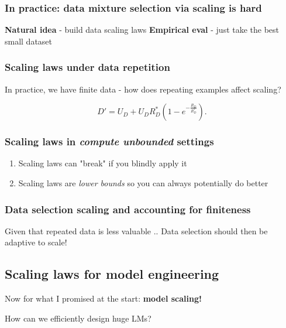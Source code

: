 \documentclass[12pt,twoside]{article}
\begin{document}
\subsubsection*{In practice: data mixture selection via scaling is hard}

\textbf{Natural idea} - build data scaling laws \hfill \textbf{Empirical eval} - just take the best small dataset

\subsubsection*{Scaling laws under data repetition}

In practice, we have finite data - how does repeating examples affect scaling?

\begin{equation*}
    D' = U_D + U_DR^{*}_D(1 - e^{-\frac{R_D}{R^{*}_D}}).
\end{equation*}

\subsubsection*{Scaling laws in \textit{compute unbounded} settings}

\begin{enumerate}
    \item Scaling laws can "break" if you blindly apply it
    \item Scaling laws are \textit{lower bounds} so you can always potentially do better
\end{enumerate}

\subsubsection*{Data selection scaling and accounting for finiteness}

Given that repeated data is less valuable .. Data selection should then be adaptive to scale!

\subsection*{Scaling laws for model engineering}

Now for what I promised at the start: \textbf{model scaling!}

\begin{question}
    How can we efficiently design huge LMs?
\end{question}
\end{document}
